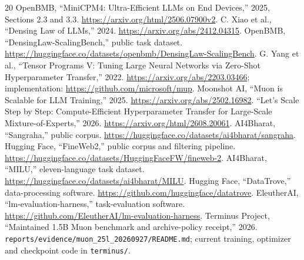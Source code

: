 \documentclass[10pt,a4paper]{article}
\begin{document}
\begingroup\raggedright
\begin{thebibliography}{20}
 OpenBMB, ``MiniCPM4: Ultra-Efficient LLMs on End Devices,'' 2025, Sections 2.3 and 3.3. \url{https://arxiv.org/html/2506.07900v2}.
 C. Xiao et al., ``Densing Law of LLMs,'' 2024. \url{https://arxiv.org/abs/2412.04315}.
 OpenBMB, ``DensingLaw-ScalingBench,'' public task dataset. \url{https://huggingface.co/datasets/openbmb/DensingLaw-ScalingBench}.
 G. Yang et al., ``Tensor Programs V: Tuning Large Neural Networks via Zero-Shot Hyperparameter Transfer,'' 2022. \url{https://arxiv.org/abs/2203.03466}; implementation: \url{https://github.com/microsoft/mup}.
 Moonshot AI, ``Muon is Scalable for LLM Training,'' 2025. \url{https://arxiv.org/abs/2502.16982}.
 ``Let's Scale Step by Step: Compute-Efficient Hyperparameter Transfer for Large-Scale Mixture-of-Experts,'' 2026. \url{https://arxiv.org/html/2608.20061}.
 AI4Bharat, ``Sangraha,'' public corpus. \url{https://huggingface.co/datasets/ai4bharat/sangraha}.
 Hugging Face, ``FineWeb2,'' public corpus and filtering pipeline. \url{https://huggingface.co/datasets/HuggingFaceFW/fineweb-2}.
 AI4Bharat, ``MILU,'' eleven-language task dataset. \url{https://huggingface.co/datasets/ai4bharat/MILU}.
 Hugging Face, ``DataTrove,'' data-processing software. \url{https://github.com/huggingface/datatrove}.
 EleutherAI, ``lm-evaluation-harness,'' task-evaluation software. \url{https://github.com/EleutherAI/lm-evaluation-harness}.
 Terminus Project, ``Maintained 1.5B Muon benchmark and archive-policy receipt,'' 2026. \texttt{reports/evidence/muon\_25l\_20260927/README.md}; current training, optimizer and checkpoint code in \texttt{terminus/}.
\end{thebibliography}
\endgroup
\end{document}
